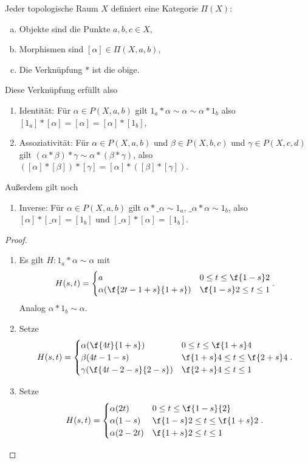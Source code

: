\begin{st}
	Jeder topologische Raum $X$ definiert eine Kategorie $\Pi(X)$:
	\begin{enumerate}[(a)]
		\item
			Objekte sind die Punkte $a,b,c \in X$,
		\item
			Morphismen sind $[\alpha] \in \Pi(X,a,b)$,
		\item
			Die Verknüpfung $*$ ist die obige.
	\end{enumerate}
	Diese Verknüpfung erfüllt also
	\begin{enumerate}[(1)]
		\item
			Identität: Für $\alpha \in P(X,a,b)$ gilt $1_a * \alpha \sim \alpha \sim \alpha * 1_b$
			also $[1_a]*[\alpha] = [\alpha] = [\alpha] * [1_b]$,
		\item
			Assoziativität: Für $\alpha \in P(X,a,b)$ und $\beta \in P(X,b,c)$ und $\gamma \in P(X,c,d)$ gilt $(\alpha*\beta)*\gamma \sim \alpha*(\beta*\gamma)$, also $([\alpha]*[\beta])*[\gamma] = [\alpha] *([\beta]*[\gamma])$.
	\end{enumerate}
	Außerdem gilt noch
	\begin{enumerate}[(1),resume]
		\item
			Inverse: Für $\alpha \in P(X,a,b)$ gilt $\alpha * \_\alpha \sim 1_a$, $\_\alpha * \alpha \sim 1_b$, also $[\alpha]*[\_\alpha] = [1_b]$ und $[\_\alpha] * [\alpha] = [1_b]$.
	\end{enumerate}
	\begin{proof}
		\begin{enumerate}[(1)]
			\item
				Es gilt $H: 1_a * \alpha \sim \alpha$ mit
				\[
					H(s,t) = \begin{cases}
						a & 0 \le t \le \f{1-s}2 \\
						\alpha (\f{2t-1+s}{1+s}) & \f {1-s}2 \le t \le 1
					\end{cases}.
				\]
				Analog $\alpha * 1_b \sim \alpha$.
			\item
				Setze
				\[
					H(s,t) = \begin{cases}
						\alpha(\f{4t}{1+s}) & 0 \le t \le \f{1+s}4 \\
						\beta(4t - 1-s) & \f{1+s}4 \le t \le \f{2+s}4 \\
						\gamma(\f{4t-2-s}{2-s}) & \f{2+s}4 \le t \le 1
					\end{cases}.
				\]
			\item
				Setze
				\[
					H(s,t) = \begin{cases}
						\alpha(2t) & 0 \le t \le \f{1-s}{2} \\
						\alpha(1-s) & \f{1-s}2 \le t \le \f{1+s}2 \\
						\alpha(2-2t)  & \f{1+s}2 \le t \le 1
					\end{cases}.
				\]
		\end{enumerate}
	\end{proof}
\end{st}




